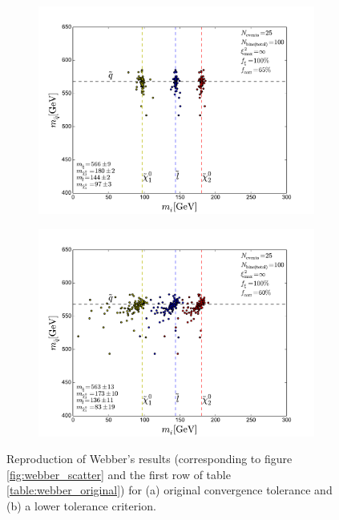 \documentclass[twoside,english]{uiofysmaster}
\begin{document}
\begin{figure}[hbt]
	\centering
	\begin{subfigure}[b]{0.6\textwidth}
		\includegraphics[width=\textwidth]{figures/webber_rec_table/webber_rec_table-samesettings_0psmear-nocut.pdf} 
		\caption{ }
		\label{fig:webber_rec_scatter_tolerance-comparison_a}
	\end{subfigure}

	\begin{subfigure}[b]{0.6\textwidth}
		\includegraphics[width=\textwidth]{figures/webber_rec_table/webber_HW-rec_nocut.pdf}
		\caption{ } 
		\label{fig:webber_rec_scatter_tolerance-comparison_b}
	\end{subfigure}
	\caption{Reproduction of Webber's results (corresponding to figure \ref{fig:webber_scatter} and the first row of table \ref{table:webber_original}) for (a) original convergence tolerance and (b) a lower tolerance criterion.}
	\label{fig:webber_rec_scatter_tolerance-comparison}
\end{figure}
\end{document}
